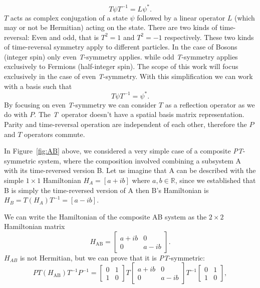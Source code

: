 \documentclass[10pt, a4paper, singlespacing]{report}
\newcommand\PT{\emph{PT}}
\newcommand\TT{\emph{T}}
\begin{document}
\begin{equation} \label{eq:3}
T \psi T^{-1}= L \psi^{*}.
\end{equation}
$T$ acts as complex conjugation of a state $\psi$ followed by a linear operator $L$ (which may or not be Hermitian) acting on the state. There are two kinds of time-reversal: Even and odd, that is $T^2 = 1$ and $T^2 = -1$ respectively. These two kinds of time-reversal symmetry apply to different particles. In the case of Bosons (integer spin) only even \TT-symmetry applies. while odd \TT-symmetry applies exclusively to Fermions (half-integer spin)\cite{Jones-Smith}.
The scope of this work will focus exclusively in the case of even \TT-symmetry. With this simplification we can work with a basis such that 
\begin{equation} \label{eq:4}
T \psi T^{-1} = \psi^{*}.
\end{equation}
By focusing on even \TT-symmetry we can consider $T$ as a reflection operator as we do with $P$. The \TT\ operator doesn't have a spatial basis matrix representation.
Parity and time-reversal operation are independent of each other, therefore the $P$ and $T$ operators commute\cite{BenderPT}.

In Figure~\ref{fig:AB} above, we considered a very simple case of a composite \PT-symmetric system, where the composition involved combining a subsystem A with its time-reversed version B.
Let us imagine that A can be described with the simple $1 \times 1 $ Hamiltonian $H_{A} = [a+ib]$ where $a, b \in \mathds{R}$, since we established that B is simply the time-reversed version of A then B's Hamiltonian is $H_{B} = T (H_{A}) T^{-1} = [a-ib]$.

We can write the Hamiltonian of the composite AB system as the $2 \times 2$ Hamiltonian matrix
\begin{equation} \label{eq:5}
H_{\mathrm{AB}} = \begin{bmatrix}
a+ib & 0 \\ 
0 & a-ib
\end{bmatrix}.
\end{equation}
$H_{AB}$ is not Hermitian, but we can prove that it is \PT-symmetric:
\begin{equation} \label{eq:6}
PT(H_{\mathrm{AB}})T^{-1}P^{-1} = \begin{bmatrix}
0 & 1 \\ 
1 & 0
\end{bmatrix}
T
\begin{bmatrix}
a+ib & 0 \\ 
0 & a-ib
\end{bmatrix}
T^{-1}
\begin{bmatrix}
0 & 1 \\ 
1 & 0
\end{bmatrix},
\end{equation}
\end{document}
